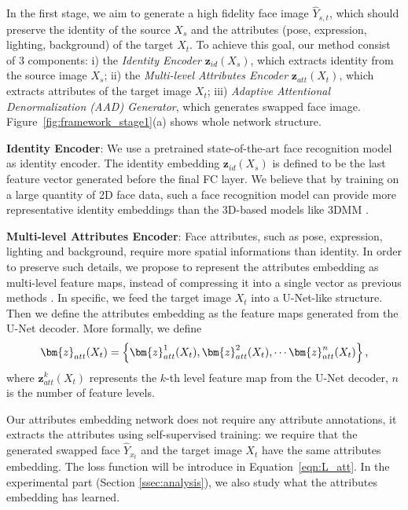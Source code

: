 In the first stage, we aim to generate a high fidelity face image $\hat{Y}_{s,t}$, which should preserve the identity of the source ${X}_s$ and the attributes (\eg pose, expression, lighting, background) of the target ${X}_t$. To achieve this goal, our method consist of 3 components: i) the \emph{Identity Encoder} $\bm{z}_{id}(X_s)$, which extracts identity from the source image $X_s$; ii) the \emph{Multi-level Attributes Encoder} $\bm{z}_{att}(X_t)$, which extracts attributes of the target image $X_t$; iii) \emph{Adaptive Attentional Denormalization (AAD) Generator}, which generates swapped face image. Figure~\ref{fig:framework_stage1}(a) shows whole network structure.

\noindent\textbf{Identity Encoder}:
We use a pretrained state-of-the-art face recognition model \cite{deng2019arcface} as identity encoder. The identity embedding $\bm{z}_{id}(X_s)$ is defined to be the last feature vector generated before the final FC layer. 
We believe that by training on a large quantity of 2D face data, such a face recognition model can provide more representative identity embeddings than the 3D-based models like 3DMM \cite{blanz2004exchanging,blanz1999morphable}.

\noindent\textbf{Multi-level Attributes Encoder}:
Face attributes, such as pose, expression, lighting and background, require more spatial informations than identity. 
In order to preserve such details, we propose to represent the attributes embedding as multi-level feature maps,
instead of compressing it into a single vector as previous methods \cite{Bao_ipgan,natsume2018rsgan}.
In specific, we feed the target image $X_t$ into a U-Net-like structure. 
Then we define the attributes embedding as the feature maps generated from the U-Net decoder.
More formally, we define
\vspace{-0.5em}
\begin{equation}
\vspace{-0.1em}
\bm{z}_{att}(X_t) = \left\{\bm{z}^1_{att}(X_t), \bm{z}^2_{att}(X_t), \cdots \bm{z}^n_{att}(X_t)\right\},
\label{eqn:attribute_embedding}
\end{equation}
where $\bm{z}^{k}_{att}(X_t)$ represents the $k$-th level feature map from the U-Net decoder, $n$ is the number of feature levels. 

Our attributes embedding network does not require any attribute annotations, it extracts the attributes using self-supervised training: we require that the generated swapped face $\hat{Y}_{x_t}$ and the target image $X_t$ have the same attributes embedding. The loss function will be introduce in Equation~\ref{eqn:L_att}. In the experimental part (Section \ref{ssec:analysis}), we also study what the attributes embedding has learned.

